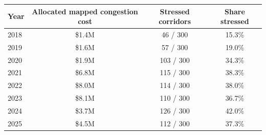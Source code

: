 \begin{table}[!htbp]
\centering
\small
\setlength{\tabcolsep}{10pt}
\renewcommand{\arraystretch}{1.15}
\begin{tabular}{@{}lccc@{}}
\toprule
Year & Allocated mapped congestion cost & Stressed corridors & Share stressed \\
\midrule
2018 & \$1.4M & 46 / 300 & 15.3\% \\
2019 & \$1.6M & 57 / 300 & 19.0\% \\
2020 & \$1.9M & 103 / 300 & 34.3\% \\
2021 & \$6.8M & 115 / 300 & 38.3\% \\
2022 & \$8.0M & 114 / 300 & 38.0\% \\
2023 & \$8.1M & 110 / 300 & 36.7\% \\
2024 & \$3.7M & 126 / 300 & 42.0\% \\
2025 & \$4.5M & 112 / 300 & 37.3\% \\
\bottomrule
\end{tabular}
\end{table}
